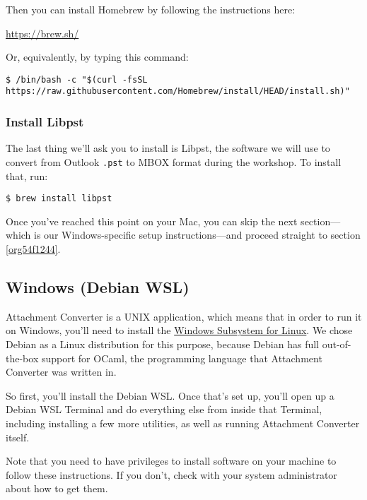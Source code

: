\documentclass[11pt]{article}
\begin{document}
Then you can install Homebrew by following the instructions here:

\url{https://brew.sh/}

Or, equivalently, by typing this command:

\footnotesize

\begin{verbatim}
$ /bin/bash -c "$(curl -fsSL https://raw.githubusercontent.com/Homebrew/install/HEAD/install.sh)"
\end{verbatim}

\normalsize

\subsubsection{Install Libpst}
\label{sec:orgbfc95dc}

The last thing we'll ask you to install is Libpst, the software we
will use to convert from Outlook \texttt{.pst} to MBOX format during the
workshop.  To install that, run:

\begin{verbatim}
$ brew install libpst
\end{verbatim}

Once you've reached this point on your Mac, you can skip the next
section---which is our Windows-specific setup instructions---and
proceed straight to section \ref{org54f1244}.

\subsection{Windows (Debian WSL) \label{org0b076b3}}
\label{sec:orgc2d19ca}

Attachment Converter is a UNIX application, which means that in order
to run it on Windows, you'll need to install the \href{https://en.wikipedia.org/wiki/Windows\_Subsystem\_for\_Linux}{Windows Subsystem for
Linux}.  We chose Debian as a Linux distribution for this purpose,
because Debian has full out-of-the-box support for OCaml, the
programming language that Attachment Converter was written in.

So first, you'll install the Debian WSL.  Once that's set up, you'll
open up a Debian WSL Terminal and do everything else from inside that
Terminal, including installing a few more utilities, as well as
running Attachment Converter itself.

Note that you need to have privileges to install software on your
machine to follow these instructions.  If you don't, check with your
system administrator about how to get them.
\end{document}
